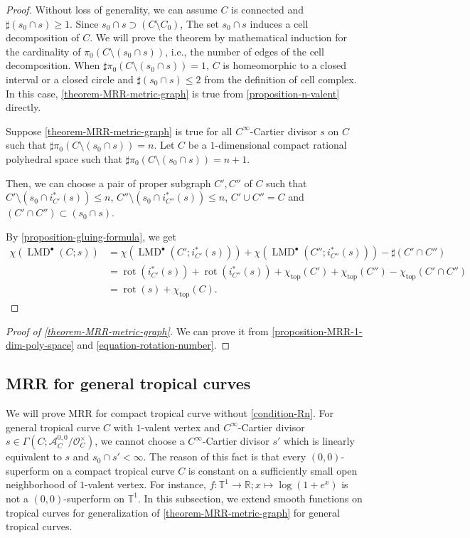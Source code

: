 \documentclass[a4paper,dvipdfmx,reqno,12pt]{amsart}
\theoremstyle{definition}
\newcommand{\opn}[1]{\operatorname{#1}}
\numberwithin{equation}{section}
\begin{document}
\begin{proof}
Without loss of generality, we can assume $C$ is 
connected and $\sharp (s_0\cap s)\geq 1$.
Since $s_0\cap s\supset (C\setminus C_0)$, 
The set $s_0\cap s$ induces a cell decomposition of 
$C$. We will prove the theorem by mathematical 
induction for the cardinality of 
$\pi_0(C\setminus (s_0 \cap s))$, i.e., the 
number of edges of the cell decomposition.
When $\sharp\pi_0(C\setminus (s_0 \cap s))=1$, 
$C$ is homeomorphic to a closed interval 
or a closed circle and 
$\sharp (s_0\cap s)\leq 2$ 
from the definition of cell complex.
In this case, \cref{theorem-MRR-metric-graph} is 
true from \cref{proposition-n-valent} directly.

Suppose \cref{theorem-MRR-metric-graph} is true
for all $C^{\infty}$-Cartier divisor $s$ on 
$C$ such that $\sharp \pi_0(C\setminus (s_0 \cap s))=n$.
Let $C$ be a $1$-dimensional 
compact rational polyhedral space
such that $\sharp\pi_0(C\setminus (s_0 \cap s))=n+1$.

Then, we can choose a pair of proper subgraph $C',C''$ of
$C$ such that
$C'\setminus (s_0\cap i^{*}_{C'}(s))\leq n$,
$C''\setminus (s_0\cap i^{*}_{C''}(s))\leq n$,
$C'\cup C''=C$
and $(C'\cap C'')\subset (s_0\cap s)$.

By \cref{proposition-gluing-formula}, we get 
\begin{align*}
\chi(\opn{LMD}^{\bullet}(C;s))
&=\chi(\opn{LMD}^{\bullet}(C';i_{C'}^{*}(s)))
+\chi(\opn{LMD}^{\bullet}(C'';i_{C''}^{*}(s)))
-\sharp(C'\cap C'') \\
&=\opn{rot}(i_{C'}^{*}(s))
+\opn{rot}(i_{C''}^{*}(s))
+\chi_{\opn{top}}(C')+\chi_{\opn{top}}(C'')
-\chi_{\opn{top}}(C'\cap C'') \\
&=\opn{rot}(s)+\chi_{\opn{top}}(C).
\end{align*}

\end{proof}

\begin{proof}[{Proof of \cref{theorem-MRR-metric-graph}}]
We can prove it from \cref{proposition-MRR-1-dim-poly-space}
and \cref{equation-rotation-number}.
\end{proof}


\subsection{MRR for general tropical curves}
\label{section-tropical-curve-general}
We will prove MRR for compact tropical curve 
without \cref{condition-Rn}. 
For general tropical curve $C$ with $1$-valent
vertex and $C^{\infty}$-Cartier divisor 
$s\in\Gamma(C;\mathcal{A}^{0,0}_C/\mathcal{O}^{\times}_C)$,
we cannot choose a $C^{\infty}$-Cartier divisor $s'$ which
is linearly equivalent to $s$ and $s_0\cap s'<\infty$.
The reason of this fact is that every 
$(0,0)$-superform on a compact tropical curve 
$C$ is constant on a sufficiently
small open neighborhood of $1$-valent vertex.
For instance, 
$f\colon \mathbb{T}^1 \to \mathbb{R}; x\mapsto 
\opn{log}(1+e^{x})$ is not a $(0,0)$-superform
on $\mathbb{T}^{1}$.
In this subsection, we extend smooth functions
on tropical curves for generalization of 
\cref{theorem-MRR-metric-graph} for general 
tropical curves.
\end{document}
